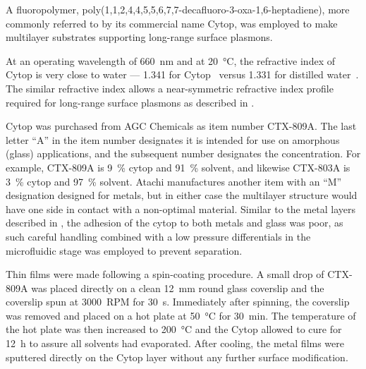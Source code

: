 A fluoropolymer, poly(1,1,2,4,4,5,5,6,7,7-decafluoro-3-oxa-1,6-heptadiene),
more commonly referred to by its commercial name Cytop, was employed to
make multilayer substrates supporting long-range surface plasmons.

At an operating wavelength of \SI{660}{\nano\meter} and at
\SI{20}{\celsius}, the refractive index of Cytop is very close to water ---
1.341 for Cytop~\cite{mikevs2005synthesis} versus 1.331 for distilled
water~\cite{andreasson1971measurement}.  The similar refractive index
allows a near-symmetric refractive index profile required for long-range
surface plasmons as described in .

Cytop was purchased from AGC Chemicals as item number CTX-809A.  The last
letter ``A'' in the item number designates it is intended for use on amorphous
(glass) applications, and the subsequent number designates the concentration.
For example, CTX-809A is \SI{9}{\percent} cytop and \SI{91}{\percent} solvent,
and likewise CTX-803A is \SI{3}{\percent} cytop and \SI{97}{\percent} solvent.
Atachi manufactures another item with an ``M'' designation designed for
metals, but in either case the multilayer structure would have one side in
contact with a non-optimal material.  Similar to the metal layers described in
, the adhesion of the cytop to both metals and
glass was poor, as such careful handling combined with a low pressure
differentials in the microfluidic stage was employed to prevent separation.

Thin films were made following a spin-coating procedure.  A small drop of
CTX-809A was placed directly on a clean \SI{12}{\milli\meter} round glass
coverslip and the coverslip spun at \SI{3000}{RPM} for \SI{30}{\second}.
Immediately after spinning, the coverslip was removed and placed on a hot
plate at \SI{50}{\celsius} for \SI{30}{\minute}.  The temperature of the hot
plate was then increased to \SI{200}{\celsius} and the Cytop allowed to cure
for \SI{12}{\hour} to assure all solvents had evaporated.  After cooling, the
metal films were sputtered directly on the Cytop layer without any further
surface modification.


